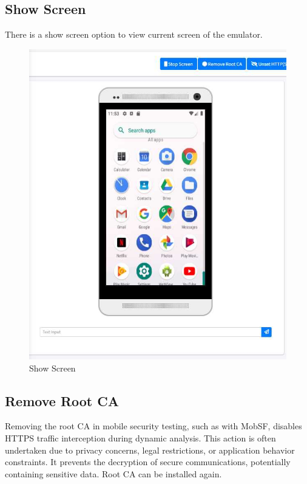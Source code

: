 \documentclass{report}
\begin{document}
\subsection{Show Screen}
There is a show screen option to view current screen of the emulator.
\begin{figure}[hbt!]
    \centering
    \includegraphics[width=1\linewidth]{Dynamic Analyzer/show_screen.jpg}
    \caption{Show Screen}
    \label{fig:example}
\end{figure}
\FloatBarrier
\subsection{Remove Root CA}
Removing the root CA in mobile security testing, such as with MobSF, disables HTTPS traffic interception during dynamic analysis. This action is often undertaken due to privacy concerns, legal restrictions, or application behavior constraints. It prevents the decryption of secure communications, potentially containing sensitive data. Root CA can be installed again.
\end{document}
